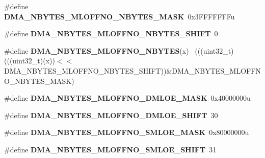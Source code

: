 \begin{DoxyCompactItemize}
\item 
\hypertarget{group___d_m_a___register___masks_ga7c3faf561a42d91448404d94823535ff}{}\#define {\bfseries D\+M\+A\+\_\+\+N\+B\+Y\+T\+E\+S\+\_\+\+M\+L\+O\+F\+F\+N\+O\+\_\+\+N\+B\+Y\+T\+E\+S\+\_\+\+M\+A\+S\+K}~0x3\+F\+F\+F\+F\+F\+F\+Fu\label{group___d_m_a___register___masks_ga7c3faf561a42d91448404d94823535ff}

\item 
\hypertarget{group___d_m_a___register___masks_ga0ce6afd8f00fcbe8d7dee4fcefa8ffdf}{}\#define {\bfseries D\+M\+A\+\_\+\+N\+B\+Y\+T\+E\+S\+\_\+\+M\+L\+O\+F\+F\+N\+O\+\_\+\+N\+B\+Y\+T\+E\+S\+\_\+\+S\+H\+I\+F\+T}~0\label{group___d_m_a___register___masks_ga0ce6afd8f00fcbe8d7dee4fcefa8ffdf}

\item 
\hypertarget{group___d_m_a___register___masks_ga299065802814c44b706528b3e525f044}{}\#define {\bfseries D\+M\+A\+\_\+\+N\+B\+Y\+T\+E\+S\+\_\+\+M\+L\+O\+F\+F\+N\+O\+\_\+\+N\+B\+Y\+T\+E\+S}(x)                      ~(((uint32\+\_\+t)(((uint32\+\_\+t)(x))$<$$<$D\+M\+A\+\_\+\+N\+B\+Y\+T\+E\+S\+\_\+\+M\+L\+O\+F\+F\+N\+O\+\_\+\+N\+B\+Y\+T\+E\+S\+\_\+\+S\+H\+I\+F\+T))\&D\+M\+A\+\_\+\+N\+B\+Y\+T\+E\+S\+\_\+\+M\+L\+O\+F\+F\+N\+O\+\_\+\+N\+B\+Y\+T\+E\+S\+\_\+\+M\+A\+S\+K)\label{group___d_m_a___register___masks_ga299065802814c44b706528b3e525f044}

\item 
\hypertarget{group___d_m_a___register___masks_ga3059dc9418c2806216aa96ef75adb3fe}{}\#define {\bfseries D\+M\+A\+\_\+\+N\+B\+Y\+T\+E\+S\+\_\+\+M\+L\+O\+F\+F\+N\+O\+\_\+\+D\+M\+L\+O\+E\+\_\+\+M\+A\+S\+K}~0x40000000u\label{group___d_m_a___register___masks_ga3059dc9418c2806216aa96ef75adb3fe}

\item 
\hypertarget{group___d_m_a___register___masks_ga761f3f81137087b195be0750f33d7c5a}{}\#define {\bfseries D\+M\+A\+\_\+\+N\+B\+Y\+T\+E\+S\+\_\+\+M\+L\+O\+F\+F\+N\+O\+\_\+\+D\+M\+L\+O\+E\+\_\+\+S\+H\+I\+F\+T}~30\label{group___d_m_a___register___masks_ga761f3f81137087b195be0750f33d7c5a}

\item 
\hypertarget{group___d_m_a___register___masks_gafda1d79fea3353361f7ae8b49c44e20f}{}\#define {\bfseries D\+M\+A\+\_\+\+N\+B\+Y\+T\+E\+S\+\_\+\+M\+L\+O\+F\+F\+N\+O\+\_\+\+S\+M\+L\+O\+E\+\_\+\+M\+A\+S\+K}~0x80000000u\label{group___d_m_a___register___masks_gafda1d79fea3353361f7ae8b49c44e20f}

\item 
\hypertarget{group___d_m_a___register___masks_ga7fe83f71aff1752703f2ec145d70571a}{}\#define {\bfseries D\+M\+A\+\_\+\+N\+B\+Y\+T\+E\+S\+\_\+\+M\+L\+O\+F\+F\+N\+O\+\_\+\+S\+M\+L\+O\+E\+\_\+\+S\+H\+I\+F\+T}~31\label{group___d_m_a___register___masks_ga7fe83f71aff1752703f2ec145d70571a}


\end{DoxyCompactItemize}
